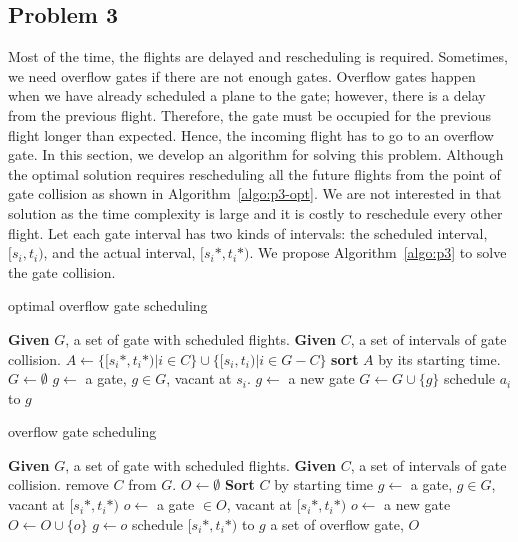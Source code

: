 \documentclass[11pt,a4paper]{article}
\begin{document}
\subsection{Problem 3}
\label{subsec:algo-prob3}
Most of the time, the flights are delayed and rescheduling is required. Sometimes, we need overflow gates if there are not enough gates. Overflow gates happen when we have already scheduled a plane to the gate; however, there is a delay from the previous flight. Therefore, the gate must be occupied for the previous flight longer than expected. Hence, the incoming flight has to go to an overflow gate. In this section, we develop an algorithm for solving this problem. Although the optimal solution requires rescheduling all the future flights from the point of gate collision as shown in Algorithm~\ref{algo:p3-opt}. We are not interested in that solution as the time complexity is large and it is costly to reschedule every other flight. Let each gate interval has two kinds of intervals: the scheduled interval, $[s_i, t_i)$, and the actual interval, $[s_i*, t_i*)$. We propose Algorithm~\ref{algo:p3} to solve the gate collision.\par

\begin{algorithm}
\caption{optimal overflow gate scheduling}
\label{algo:p3-opt}
\begin{algorithmic}
\STATE \textbf{Given} $G$, a set of gate with scheduled flights.
\STATE \textbf{Given} $C$, a set of intervals of gate collision.
\STATE $A \gets \{[s_i*, t_i*) | i \in C\} \cup \{[s_i, t_i) | i \in G-C\}$
\STATE \textbf{sort} $A$ by its starting time.
\STATE $G \gets \emptyset$
	\STATE $g \gets $ a gate, $g \in G$, vacant at $s_i$.
		\STATE $g \gets$ a new gate \label{algo:p2:newGate}
		\STATE $G \gets G \cup \{g\}$
	\ENDIF
	\STATE schedule $a_i$ to $g$ \label{algo:p2:schedule}
\ENDFOR
\end{algorithmic}
\end{algorithm}

\begin{algorithm}
\caption{overflow gate scheduling}\label{algo:p3}
\begin{algorithmic}
\STATE \textbf{Given} $G$, a set of gate with scheduled flights.
\STATE \textbf{Given} $C$, a set of intervals of gate collision.
\STATE remove $C$ from $G$.
\STATE $O \gets \emptyset$
\STATE \textbf{Sort} $C$ by starting time
\FORALL{$[s_i*, t_i*)$ in $C$}
	\STATE $g \gets $ a gate, $g \in G$, vacant at $[s_i*, t_i*)$
		\STATE $o \gets $ a gate $\in O$, vacant at $[s_i*, t_i*)$
			\STATE $o \gets$ a new gate
			\STATE $O \gets O \cup \{o\}$
		\ENDIF
		\STATE $g \gets o$
	\ENDIF
	\STATE schedule $[s_i*, t_i*)$ to $g$
\ENDFOR
\RETURN a set of overflow gate, $O$
\end{algorithmic}
\end{algorithm}
\end{document}
